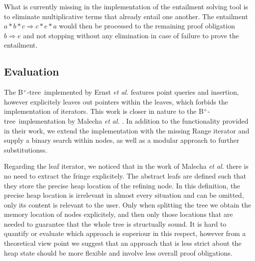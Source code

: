 \documentclass[a4paper,UKenglish,cleveref, autoref, thm-restate]{lipics-v2021}
\newcommand{\btree}{B$^+$-tree}
\begin{document}
What is currently missing in the implementation of the entailment
solving tool is to eliminate multiplicative terms that
already entail one another.
The entailment $a * b * c \Rightarrow c * e * a$ would
then be processed to the remaining proof obligation $b \Rightarrow e$
and not stopping without any elimination in case of failure to prove the entailment.



\subsection{Evaluation}


The \btree\ implemented by Ernst \emph{et al.} \cite{DBLP:journals/sosym/ErnstSR15} features point queries and insertion,
however explicitely leaves out pointers within the leaves,
which forbids the implementation of iterators.
This work is closer in nature to the \btree\ implementation by Malecha \emph{et al.} \cite{DBLP:conf/popl/MalechaMSW10}.
In addition to the functionality provided in their work, we extend
the implementation with the missing Range iterator
and supply a binary search within nodes, as well as a modular approach
to further substitutionss.

Regarding the leaf iterator, we noticed that in the work of Malecha \emph{et al.}
there is no need to extract the fringe explicitely.
The abstract leafs are defined such that they store the precise heap location of the refining node.
In this definition, the precise heap location
is irrelevant in almost every situation and can be omitted,
only its content is relevant to the user.
Only when splitting the tree we obtain the memory location
of nodes explicitely, and then only those locations that are needed to guarantee
that the whole tree is structually sound.
It is hard to quantify or evaluate which approach
is superiour in this respect,
however from a theoretical view point
we suggest that an approach that is less strict
about the heap state should be more flexible and involve less overall proof obligations.
\end{document}
